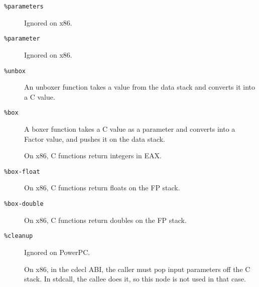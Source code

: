 \documentclass{book}
\begin{document}
\begin{description}

\item[\texttt{\%parameters}] Ignored on x86.

\item[\texttt{\%parameter}] Ignored on x86.

\item[\texttt{\%unbox}]  An unboxer function takes a value from the data stack
  and converts it into a C value.
  
\item[\texttt{\%box}]  A boxer function takes a C value as a parameter and
  converts into a Factor value, and pushes it on the data
  stack.

  On x86, C functions return integers in EAX.

\item[\texttt{\%box-float}] On x86, C functions return floats on the FP stack.

\item[\texttt{\%box-double}] On x86, C functions return doubles on the FP stack.

\item[\texttt{\%cleanup}] Ignored on PowerPC.

  On x86, in the cdecl ABI, the caller must pop input
  parameters off the C stack. In stdcall, the callee does
  it, so this node is not used in that case.
  
\end{description}

\printglossary


\end{document}
